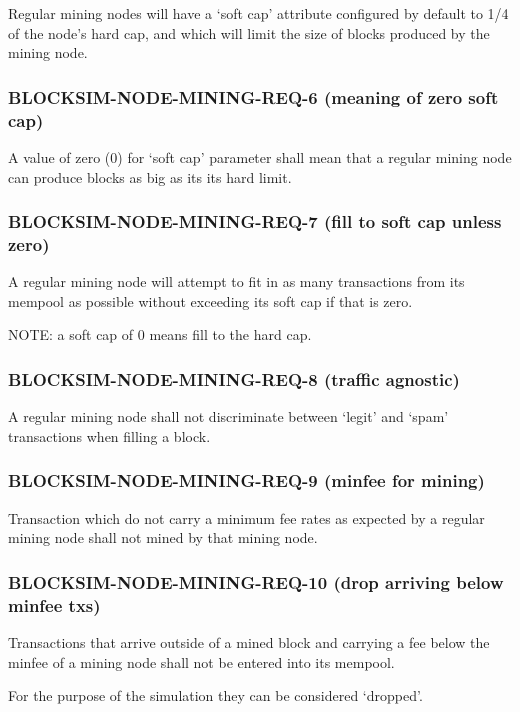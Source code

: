 \documentclass{scrreprt}
\begin{document}
Regular mining nodes will have a `soft cap' attribute configured by default to
1/4 of the node's hard cap, and which will limit the size of blocks produced
by the mining node.


\subsubsection{BLOCKSIM-NODE-MINING-REQ-6 (meaning of zero soft cap)}

A value of zero (0) for `soft cap' parameter shall mean that a regular mining
node can produce blocks as big as its its hard limit.


\subsubsection{BLOCKSIM-NODE-MINING-REQ-7 (fill to soft cap unless zero)}

A regular mining node will attempt to fit in as many transactions from its mempool
as possible without exceeding its soft cap if that is zero.

NOTE: a soft cap of 0 means fill to the hard cap.


\subsubsection{BLOCKSIM-NODE-MINING-REQ-8 (traffic agnostic)}

A regular mining node shall not discriminate between `legit' and `spam' transactions
when filling a block.

\subsubsection{BLOCKSIM-NODE-MINING-REQ-9 (minfee for mining)}

Transaction which do not carry a minimum fee rates as expected by a regular mining
node shall not mined by that mining node.


\subsubsection{BLOCKSIM-NODE-MINING-REQ-10 (drop arriving below minfee txs)}

Transactions that arrive outside of a mined block and carrying a fee below
the minfee of a mining node shall not be entered into its mempool.

For the purpose of the simulation they can be considered `dropped'.
\end{document}
